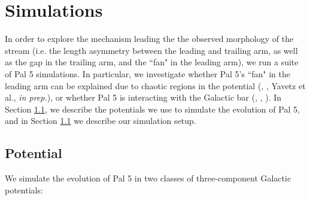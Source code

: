 \documentclass[modern]{aastex62}
\begin{document}
\section{Simulations}
\label{sec:sim}
In order to explore the mechanism leading the the observed morphology of the stream (i.e. the length asymmetry between the leading and trailing arm, as well as the gap in the trailing arm, and the ``fan" in the leading arm), we run a suite of Pal 5 simulations. In particular, we investigate whether Pal 5's ``fan" in the leading arm can be explained due to chaotic regions in the potential (\citealt{Pearson:2015}, \citealt{Price-Whelan:2016}, Yavetz et al., {\it in prep.}), or whether Pal 5 is interacting with the Galactic bar (\citealt{Pearson:2017}, \citealt{Erkal:2017}, \citealt{Banik:2019}). In Section \ref{sec:potential}, we describe the potentials we use to simulate the evolution of Pal 5, and in Section \ref{sec:potential} we describe our simulation setup. 

\subsection{Potential}
\label{sec:potential}
We simulate the evolution of Pal 5 in two classes of three-component Galactic potentials: 
\end{document}
